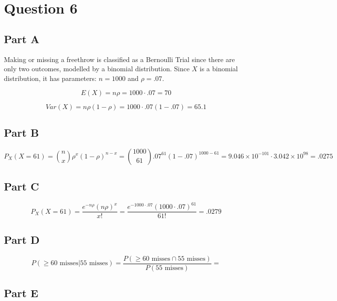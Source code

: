 \documentclass[letterpaper]{article}
\begin{document}
\newpage

\section*{Question 6}

\subsection*{Part A}

Making or missing a freethrow is classified as a Bernoulli Trial since there are only two outcomes, modelled by a binomial distribution. Since $X$ is a binomial distribution, it has parameters: $n = 1000$ and $\rho = .07$.

$$E(X) = n \rho = 1000 \cdot .07 = 70$$

$$Var(X) = n \rho (1 - \rho) = 1000 \cdot .07 (1 - .07) = 65.1$$

\subsection*{Part B}

$$P_X(X = 61) = \binom{n}{x} \rho^x (1 - \rho)^{n-x} = \binom{1000}{61} .07^{61} (1 - .07)^{1000-61} = 9.046 \times 10^{-101} \cdot 3.042 \times 10^{98} = .0275$$

\subsection*{Part C}

$$P_X(X = 61) = \frac{e^{-n \rho} (n \rho)^x}{x!} = \frac{e^{-1000 \cdot .07} (1000 \cdot .07)^61}{61!} = .0279$$

\subsection*{Part D}

$$P(\geq \text{60 misses} | \text{55 misses}) = \frac{P(\geq \text{60 misses} \cap \text{55 misses})}{P(\text{55 misses})} = $$

\subsection*{Part E}
\end{document}

